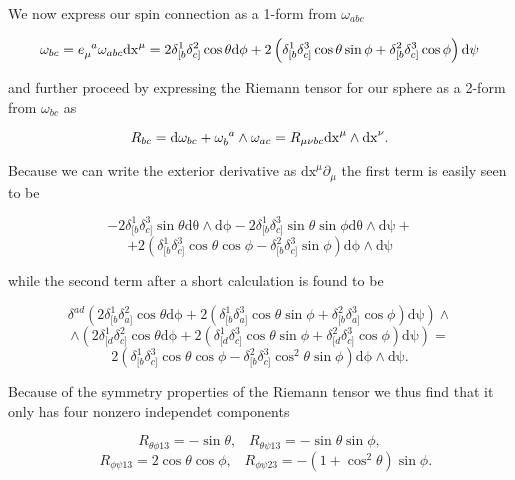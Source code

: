 We now express our spin connection as a 1-form from $\omega_{abc}$

$$
\omega_{bc}=e\eii{\mu}{a}\omega_{abc}\mathrm{dx}^\mu=
2\delta_{[b}^1\delta_{c]}^2\cos\theta\mathrm{d\phi}+2\left(\delta_{[b}^1\delta_{c]}^3\cos\theta\sin\phi+\delta_{[b}^2\delta_{c]}^3\cos\phi\right)\mathrm{d\psi}
$$

and further proceed by expressing the Riemann tensor for our sphere as a 2-form from $\omega_{bc}$ as

$$
R_{bc}=\mathrm{d}\omega_{bc}+\omega\eii{b}{a}\wedge\omega_{ac}=R_{\mu\nu bc}\mathrm{dx}^\mu\wedge\mathrm{dx}^\nu.
$$

Because we can write the exterior derivative as $\mathrm{dx}^\mu\partial_\mu$ the first term is easily seen to be

\begin{equation*}
-2\delta_{[b}^1\delta_{c]}^3\sin\theta\mathrm{d\theta}\wedge\mathrm{d\phi}
-2\delta_{[b}^1\delta_{c]}^3\sin\theta\sin\phi\mathrm{d\theta}\wedge\mathrm{d\psi}+
\end{equation*}
\begin{equation*}
+2\left(\delta_{[b}^1\delta_{c]}^3\cos\theta\cos\phi-\delta_{[b}^2\delta_{c]}^3\sin\phi\right)\mathrm{d\phi}\wedge\mathrm{d\psi}
\end{equation*}

while the second term after a short calculation is found to be

\begin{equation*}
\delta^{ad}\left(2\delta_{[b}^1\delta_{a]}^2\cos\theta\mathrm{d\phi}+2\left(\delta_{[b}^1\delta_{a]}^3\cos\theta\sin\phi+\delta_{[b}^2\delta_{a]}^3\cos\phi\right)\mathrm{d\psi}\right)\wedge
\end{equation*}
\begin{equation*}
\wedge\left(2\delta_{[d}^1\delta_{c]}^2\cos\theta\mathrm{d\phi}+2\left(\delta_{[d}^1\delta_{c]}^3\cos\theta\sin\phi+\delta_{[d}^2\delta_{c]}^3\cos\phi\right)\mathrm{d\psi}\right)=
\end{equation*}
\begin{equation*}
2\left(\delta_{[b}^1\delta_{c]}^3\cos\theta\cos\phi-\delta_{[b}^2\delta_{c]}^3\cos^2\theta\sin\phi\right)\mathrm{d\phi}\wedge\mathrm{d\psi}.
\end{equation*}


Because of the symmetry properties of the Riemann tensor we thus find that it only has four nonzero independet components

\begin{equation*}
R_{\theta\phi13}=-\sin\theta,\;\;\;R_{\theta\psi13}=-\sin\theta\sin\phi,
\end{equation*}
\begin{equation*}
\;\;\;R_{\phi\psi13}=2\cos\theta\cos\phi,\;\;\;R_{\phi\psi23}=-(1+\cos^2\theta)\sin\phi.
\end{equation*}


